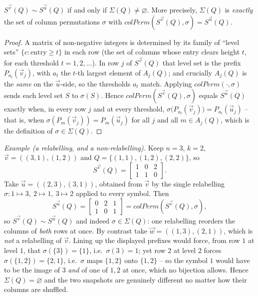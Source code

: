 \begin{lemma}[alignment]\label{lem:align}
$S^{\vec v}(Q)\sim S^{\vec u}(Q)$ if and only if $\Sigma(Q)\neq\varnothing$.  More
precisely, $\Sigma(Q)$ is \emph{exactly} the set of column permutations $\sigma$
with $colPerm(S^{\vec v}(Q),\sigma)=S^{\vec u}(Q)$.
\end{lemma}

\begin{proof}
A matrix of non-negative integers is determined by its family of
``level sets'' $\{c:\text{entry}\ge t\}$ in each row (the set of columns whose entry
clears height $t$, for each threshold $t=1,2,\ldots$).  In row $j$ of
$S^{\vec v}(Q)$ that level set is the prefix $P_{a_t}(\vec v_j)$, with $a_t$ the
$t$-th largest element of $A_j(Q)$; and crucially $A_j(Q)$ is the \emph{same} on
the $\vec u$-side, so the thresholds $a_t$ match.  Applying $colPerm(\cdot,\sigma)$
sends each level set $S$ to $\sigma(S)$.  Hence $colPerm(S^{\vec v}(Q),\sigma)$
equals $S^{\vec u}(Q)$ exactly when, in every row $j$ and at every threshold,
$\sigma\bigl(P_{a_t}(\vec v_j)\bigr)=P_{a_t}(\vec u_j)$ -- that is, when
$\sigma(P_m(\vec v_j))=P_m(\vec u_j)$ for all $j$ and all $m\in A_j(Q)$, which is the
definition of $\sigma\in\Sigma(Q)$.
\end{proof}

\noindent\textit{Example (a relabelling, and a non-relabelling).}  Keep
$n=3$, $k=2$, $\vec v=((3,1),(1,2))$ and $Q=\{(1,1),(1,2),(2,2)\}$, so
\[
S^{\vec v}(Q)=\begin{bmatrix}1&0&2\\1&1&0\end{bmatrix}.
\]
Take $\vec u=((2,3),(3,1))$, obtained from $\vec v$ by the single relabelling
$\sigma:1\mapsto3,\ 2\mapsto1,\ 3\mapsto2$ applied to every symbol.  Then
\[
S^{\vec u}(Q)=\begin{bmatrix}0&2&1\\1&0&1\end{bmatrix}
=colPerm\!\left(S^{\vec v}(Q),\sigma\right),
\]
so $S^{\vec v}(Q)\sim S^{\vec u}(Q)$ and indeed $\sigma\in\Sigma(Q)$: one
relabelling reorders the columns of \emph{both} rows at once.  By contrast take
$\vec w=((1,3),(2,1))$, which is \emph{not} a relabelling of $\vec v$.  Lining up
the displayed prefixes would force, from row $1$ at level $1$, that
$\sigma(\{3\})=\{1\}$, i.e.\ $\sigma(3)=1$; yet row $2$ at level $2$ forces
$\sigma(\{1,2\})=\{2,1\}$, i.e.\ $\sigma$ maps $\{1,2\}$ onto $\{1,2\}$ -- so the
symbol $1$ would have to be the image of $3$ \emph{and} of one of $1,2$ at once,
which no bijection allows.  Hence $\Sigma(Q)=\varnothing$ and the two snapshots are
genuinely different no matter how their columns are shuffled.

